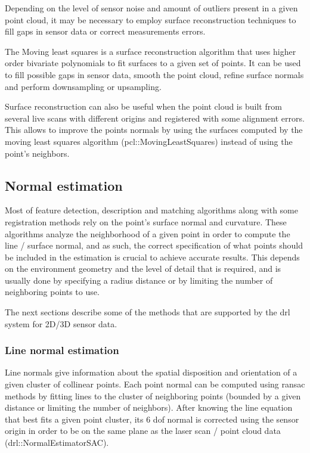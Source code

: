 Depending on the level of sensor noise and amount of outliers present in a given point cloud, it may be necessary to employ surface reconstruction techniques to fill gaps in sensor data or correct measurements errors.

The Moving least squares \cite{Alexa2003} is a surface reconstruction algorithm that uses higher order bivariate polynomials to fit surfaces to a given set of points. It can be used to fill possible gaps in sensor data, smooth the point cloud, refine surface normals and perform downsampling or upsampling.

Surface reconstruction can also be useful when the point cloud is built from several live scans with different origins and registered with some alignment errors. This allows to improve the points normals by using the surfaces computed by the moving least squares algorithm (pcl::MovingLeastSquares) instead of using the point's neighbors.


\subsection{Normal estimation}

Most of feature detection, description and matching algorithms along with some registration methods rely on the point's surface normal and curvature. These algorithms analyze the neighborhood of a given point in order to compute the line / surface normal, and as such, the correct specification of what points should be included in the estimation is crucial to achieve accurate results. This depends on the environment geometry and the level of detail that is required, and is usually done by specifying a radius distance or by limiting the number of neighboring points to use.

The next sections describe some of the methods that are supported by the \gls{drl} system for 2D/3D sensor data.


\subsubsection{Line normal estimation}

Line normals give information about the spatial disposition and orientation of a given cluster of collinear points. Each point normal can be computed using \gls{ransac} methods \cite{Fischler1981} by fitting lines to the cluster of neighboring points (bounded by a given distance or limiting the number of neighbors). After knowing the line equation that best fits a given point cluster, its 6 \gls{dof} normal is corrected using the sensor origin in order to be on the same plane as the laser scan / point cloud data (drl::NormalEstimatorSAC).


